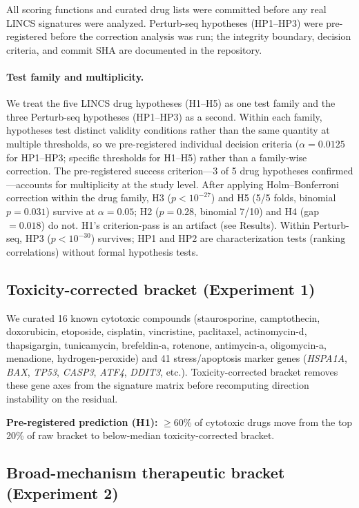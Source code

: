 \documentclass{article}
\begin{document}
All scoring functions and curated drug lists were committed before any real
LINCS signatures were analyzed. Perturb-seq hypotheses (HP1--HP3) were
pre-registered before the correction analysis was run; the integrity
boundary, decision criteria, and commit SHA are documented in the
repository.

\paragraph{Test family and multiplicity.}
We treat the five LINCS drug hypotheses (H1--H5) as one test family and the
three Perturb-seq hypotheses (HP1--HP3) as a second. Within each family,
hypotheses test distinct validity conditions rather than the same quantity at
multiple thresholds, so we pre-registered individual decision criteria
($\alpha = 0.0125$ for HP1--HP3; specific thresholds for H1--H5) rather than
a family-wise correction. The pre-registered success criterion---3 of 5 drug
hypotheses confirmed---accounts for multiplicity at the study level.
After applying Holm--Bonferroni correction within the drug family, H3
($p < 10^{-27}$) and H5 (5/5 folds, binomial $p = 0.031$) survive at
$\alpha = 0.05$; H2 ($p = 0.28$, binomial 7/10) and H4 (gap $= 0.018$)
do not. H1's criterion-pass is an artifact (see Results). Within Perturb-seq,
HP3 ($p < 10^{-30}$) survives; HP1 and HP2 are characterization tests
(ranking correlations) without formal hypothesis tests.

\subsection{Toxicity-corrected bracket (Experiment 1)}

We curated 16 known cytotoxic compounds (staurosporine, camptothecin,
doxorubicin, etoposide, cisplatin, vincristine, paclitaxel, actinomycin-d,
thapsigargin, tunicamycin, brefeldin-a, rotenone, antimycin-a, oligomycin-a,
menadione, hydrogen-peroxide) and 41 stress/apoptosis marker genes
(\emph{HSPA1A}, \emph{BAX}, \emph{TP53}, \emph{CASP3}, \emph{ATF4},
\emph{DDIT3}, etc.). Toxicity-corrected bracket removes these gene axes from
the signature matrix before recomputing direction instability on the residual.

\textbf{Pre-registered prediction (H1):} $\geq$60\% of cytotoxic drugs move
from the top 20\% of raw bracket to below-median toxicity-corrected bracket.

\subsection{Broad-mechanism therapeutic bracket (Experiment 2)}
\end{document}

